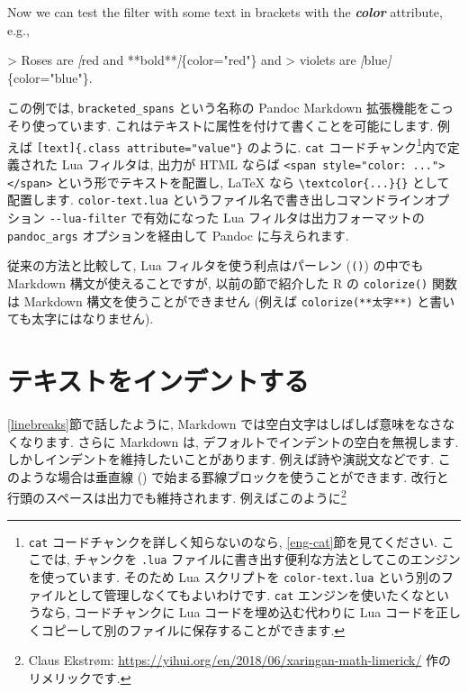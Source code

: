 \documentclass[
  11pt,
  lualatex,ja=standard,jafont=noto]{bxjsreport}
\newenvironment{Shaded}{\begin{snugshade}}{\end{snugshade}}
\newcommand{\AttributeTok}[1]{\textcolor[rgb]{0.77,0.63,0.00}{#1}}
\newcommand{\CommentTok}[1]{\textcolor[rgb]{0.56,0.35,0.01}{\textit{#1}}}
\newcommand{\InformationTok}[1]{\textcolor[rgb]{0.56,0.35,0.01}{\textbf{\textit{#1}}}}
\newcommand{\NormalTok}[1]{#1}
\newcommand{\OtherTok}[1]{\textcolor[rgb]{0.56,0.35,0.01}{#1}}
\begin{document}
\begin{Shaded}
\begin{Highlighting}[]
\NormalTok{Now we can test the filter with some text in brackets with}
\NormalTok{the }\InformationTok{\textasciigrave{}color\textasciigrave{}}\NormalTok{ attribute, e.g.,}

\AttributeTok{\textgreater{} Roses are }\CommentTok{[}\OtherTok{red and **bold**}\CommentTok{]}\AttributeTok{\{color="red"\} and}
\AttributeTok{\textgreater{} violets are }\CommentTok{[}\OtherTok{blue}\CommentTok{]}\AttributeTok{\{color="blue"\}.}
\end{Highlighting}
\end{Shaded}

この例では, \texttt{bracketed\_spans} という名称の Pandoc Markdown 拡張機能をこっそり使っています. これはテキストに属性を付けて書くことを可能にします. 例えば \texttt{{[}text{]}\{.class\ attribute="value"\}} のように. \texttt{cat} コードチャンク\footnote{\texttt{cat} コードチャンクを詳しく知らないのなら, \ref{eng-cat}節を見てください. ここでは, チャンクを \texttt{.lua} ファイルに書き出す便利な方法としてこのエンジンを使っています. そのため Lua スクリプトを \texttt{color-text.lua} という別のファイルとして管理しなくてもよいわけです. \texttt{cat} エンジンを使いたくなというなら, コードチャンクに Lua コードを埋め込む代わりに Lua コードを正しくコピーして別のファイルに保存することができます.}内で定義された Lua フィルタは, 出力が HTML ならば \texttt{\textless{}span\ style="color:\ ..."\textgreater{}\textless{}/span\textgreater{}} という形でテキストを配置し, LaTeX なら \texttt{\textbackslash{}textcolor\{...\}\{\}} として配置します. \texttt{color-text.lua} というファイル名で書き出しコマンドラインオプション \texttt{-\/-lua-filter} で有効になった Lua フィルタは出力フォーマットの \texttt{pandoc\_args} オプションを経由して Pandoc に与えられます.

従来の方法と比較して, Lua フィルタを使う利点はパーレン (\texttt{()}) の中でも Markdown 構文が使えることですが, 以前の節で紹介した R の \texttt{colorize()} 関数は Markdown 構文を使うことができません (例えば \texttt{colorize(\textquotesingle{}**太字**\textquotesingle{})} と書いても太字にはなりません).

\hypertarget{indent-text}{%
\section{テキストをインデントする}\label{indent-text}}

\ref{linebreaks}節で話したように, Markdown では空白文字はしばしば意味をなさなくなります. さらに Markdown は, デフォルトでインデントの空白を無視します. しかしインデントを維持したいことがあります. 例えば詩や演説文などです. このような場合は垂直線 (\texttt{\textbar{}}) で始まる罫線ブロックを使うことができます. 改行と行頭のスペースは出力でも維持されます. 例えばこのように\footnote{Claus Ekstrøm: \url{https://yihui.org/en/2018/06/xaringan-math-limerick/} 作のリメリックです.}
\end{document}
